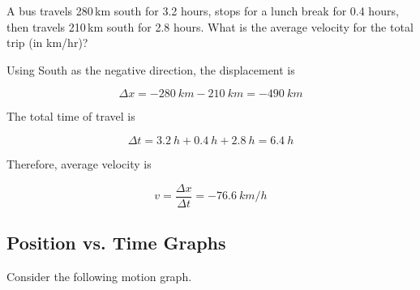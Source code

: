 \documentclass[../main-physics-problems.tex]{subfiles}
\begin{document}
\begin{questions}

\question
A bus travels 280\,km south for 3.2 hours, stops for a lunch break for 0.4 hours, then travels 210\,km south for 2.8 hours. What is the average velocity for the total trip (in km/hr)?

\begin{solution}
    Using South as the negative direction, the displacement is
    
    \begin{equation*}
        \Delta x = -\SI{280}{km} - \SI{210}{km} = \SI{-490}{km}
    \end{equation*}

    The total time of travel is

    \begin{equation*}
        \Delta t = \SI{3.2}{h} + \SI{0.4}{h} + \SI{2.8}{h} = \SI{6.4}{h}
    \end{equation*}

    Therefore, average velocity is

    \begin{equation*}
        v = \frac{\Delta x}{\Delta t} = \boxed{\SI{-76.6}{km/h}}
    \end{equation*}
\end{solution}

\clearpage
\begin{EnvUplevel}
    \subsection{Position vs. Time Graphs}
\end{EnvUplevel}

\question
Consider the following motion graph.

\begin{center}
\end{center}


\end{questions}
\end{document}
